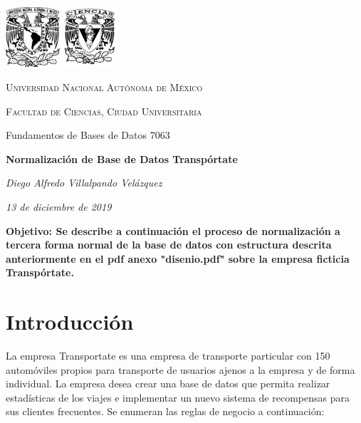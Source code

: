 \documentclass{article}
\begin{document}

{\centering 
\noindent\hrulefill \par \vspace{0.5cm}
\includegraphics[width=2cm]{unam.png} \hspace{11.5cm}
\includegraphics[width=2cm]{ciencias.png}\vspace{-2.2cm}
     {\scshape\Large Universidad Nacional Autónoma de México \par}
     {\scshape\Large Facultad de Ciencias, Ciudad Universitaria \par}
     {\Large Fundamentos de Bases de Datos 7063\par}
     \vspace{0.2cm}
     {\Large\bfseries Normalización de Base de Datos Transpórtate \par}
     \vspace{0.2cm}
     {\large\itshape Diego Alfredo Villalpando Velázquez \par \vspace{0.2cm}}
     {\large\itshape 13 de diciembre de 2019\par} \vspace{0.35cm}
     \noindent\hrulefill
}

\vspace{0.5cm}
       { \bfseries
         Objetivo:
         Se describe a continuación el proceso de normalización a tercera forma normal
         de la base de datos con estructura descrita anteriormente en el pdf anexo
         "disenio.pdf" sobre la empresa ficticia Transpórtate.
       }
       
       \noindent \tableofcontents

       
       \section{Introducción}
       {
         La empresa Transportate es una empresa de transporte particular con 150 automóviles
         propios para transporte de usuarios ajenos a la empresa y de forma individual. La
         empresa desea crear una base de datos que permita realizar estadísticas
         de los viajes e implementar un nuevo sistema de recompensas para sus clientes
         frecuentes. Se enumeran las reglas de negocio a continuación:
       }
       
\end{document}
